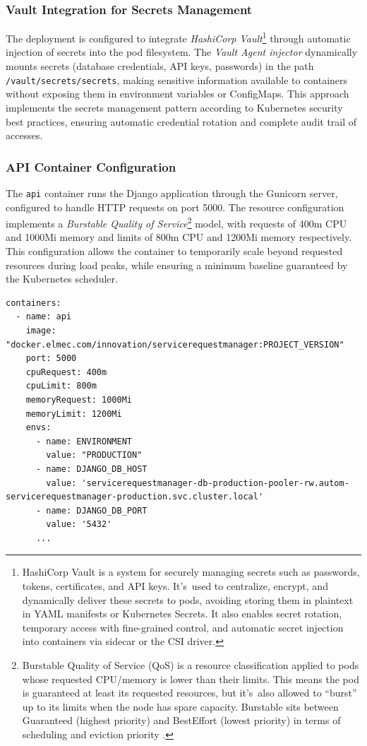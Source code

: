 \subsubsection{Vault Integration for Secrets Management}
The deployment is configured to integrate \textit{HashiCorp Vault}\footnote{HashiCorp Vault is a system for securely managing secrets such as passwords, tokens, certificates, and API keys. It's~used to centralize, encrypt, and dynamically deliver these secrets to pods, avoiding storing them in plaintext in YAML manifests or Kubernetes Secrets. It also enables secret rotation, temporary access with fine-grained control, and automatic secret injection into containers via sidecar or the CSI driver.\cite{vault}} through automatic injection of secrets into the pod filesystem. The \textit{Vault Agent injector} dynamically mounts secrets (database credentials, API keys, passwords) in the path \texttt{/vault/secrets/secrets}, making sensitive information available to containers without exposing them in environment variables or ConfigMaps. This approach implements the secrets management pattern according to Kubernetes security best practices, ensuring automatic credential rotation and complete audit trail of accesses.

\subsubsection{API Container Configuration} \label{sec:api-container-config}
The \texttt{api} container runs the Django application through the Gunicorn server, configured to handle HTTP requests on port 5000. The resource configuration implements a \textit{Burstable Quality of Service}\footnote{Burstable Quality of Service (QoS) is a resource classification applied to pods whose requested CPU/memory is lower than their limits. This means the pod is guaranteed at least its requested resources, but it's~also allowed to “burst” up to its limits when the node has spare capacity. Burstable sits between Guaranteed (highest priority) and BestEffort (lowest priority) in terms of scheduling and eviction priority \cite{burstable_qos}.} model, with requests of 400m CPU and 1000Mi memory and limits of 800m CPU and 1200Mi memory respectively. This configuration allows the container to temporarily scale beyond requested resources during load peaks, while ensuring a minimum baseline guaranteed by the Kubernetes scheduler.

\begin{verbatim}
containers:
  - name: api
    image: "docker.elmec.com/innovation/servicerequestmanager:PROJECT_VERSION"
    port: 5000
    cpuRequest: 400m
    cpuLimit: 800m
    memoryRequest: 1000Mi
    memoryLimit: 1200Mi
    envs:
      - name: ENVIRONMENT
        value: "PRODUCTION"
      - name: DJANGO_DB_HOST
        value: 'servicerequestmanager-db-production-pooler-rw.autom-servicerequestmanager-production.svc.cluster.local'
      - name: DJANGO_DB_PORT
        value: '5432'
      ...
\end{verbatim}

